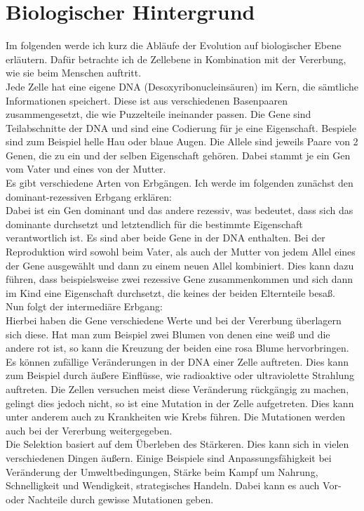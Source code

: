 \section{Biologischer Hintergrund}
Im folgenden werde ich kurz die Abläufe der Evolution auf biologischer Ebene erläutern. Dafür betrachte ich de Zellebene in Kombination mit der Vererbung, wie sie beim Menschen auftritt.\\
Jede Zelle hat eine eigene DNA (Desoxyribonucleinsäuren) im Kern, die sämtliche Informationen speichert. Diese ist aus verschiedenen Basenpaaren zusammengesetzt, die wie Puzzelteile ineinander passen. Die Gene sind Teilabschnitte der DNA und sind eine Codierung für je eine Eigenschaft. Bespiele sind zum Beispiel helle Hau oder blaue Augen. Die Allele sind jeweils Paare von 2 Genen, die zu ein und der selben Eigenschaft gehören. Dabei stammt je ein Gen vom Vater und eines von der Mutter.\\
Es gibt verschiedene Arten von Erbgängen. Ich werde im folgenden zunächst den dominant-rezessiven Erbgang erklären:\\
Dabei ist ein Gen dominant und das andere rezessiv, was bedeutet, dass sich das dominante durchsetzt und letztendlich für die bestimmte Eigenschaft verantwortlich ist. Es sind aber beide Gene in der DNA enthalten. Bei der Reproduktion wird sowohl beim Vater, als auch der Mutter von jedem Allel eines der Gene ausgewählt und dann zu einem neuen Allel kombiniert. Dies kann dazu führen, dass beispielsweise zwei rezessive Gene zusammenkommen und sich dann im Kind eine Eigenschaft durchsetzt, die keines der beiden Elternteile besaß.\\
Nun folgt der intermediäre Erbgang:\\
Hierbei haben die Gene verschiedene Werte und bei der Vererbung überlagern sich diese. Hat man zum Beispiel zwei Blumen von denen eine weiß und die andere rot ist, so kann die Kreuzung der beiden eine rosa Blume hervorbringen.\\
Es können zufällige Veränderungen in der DNA einer Zelle auftreten. Dies kann zum Beispiel durch äußere Einflüsse, wie radioaktive oder ultraviolette Strahlung auftreten. Die Zellen versuchen meist diese Veränderung rückgängig zu machen, gelingt dies jedoch nicht, so ist eine Mutation in der Zelle aufgetreten. Dies kann unter anderem auch zu Krankheiten wie Krebs führen. Die Mutationen werden auch bei der Vererbung weitergegeben.\\
Die Selektion basiert auf dem Überleben des Stärkeren. Dies kann sich in vielen verschiedenen Dingen äußern. Einige Beispiele sind Anpassungsfähigkeit bei Veränderung der Umweltbedingungen, Stärke beim Kampf um Nahrung, Schnelligkeit und Wendigkeit, strategisches Handeln. Dabei kann es auch Vor- oder Nachteile durch gewisse Mutationen geben.\\
